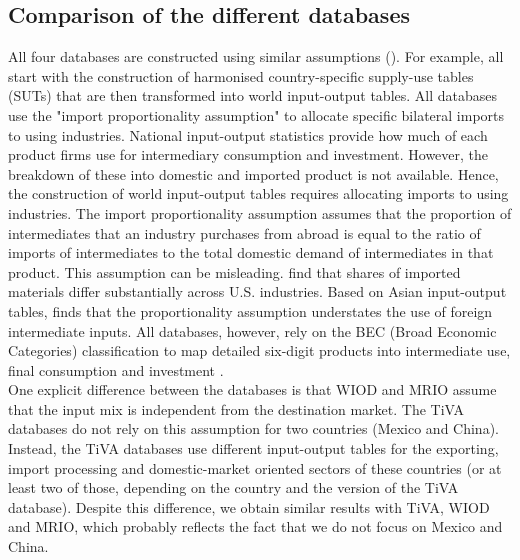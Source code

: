 \documentclass[11pt,a4paper]{paper} %
\begin{document}
\subsection{Comparison of the different databases}
All four databases are constructed using similar assumptions (\cite{OECD2011,Timmer2015,OECD2018}).
For example, all start with the construction of harmonised country-specific supply-use tables (SUTs) that are then transformed into world input-output tables.
All databases use the "import proportionality assumption" to allocate specific bilateral imports to using industries.
National input-output statistics provide how much of each product firms use for intermediary consumption and investment. 
However, the breakdown of these into domestic and imported product is not available. 
Hence, the construction of world input-output tables requires allocating imports to using industries.
The import proportionality assumption assumes that the proportion of intermediates that an industry purchases from abroad is equal to the ratio of imports of intermediates to the total domestic demand of intermediates in that product. 
This assumption can be misleading. \cite{Feenstra2012} find that shares of imported materials differ substantially across U.S. industries. Based on Asian input-output tables, \cite{Puzzello2012} finds that the proportionality assumption understates the use of foreign intermediate inputs. All databases, however, rely on the BEC (Broad Economic Categories) classification to map detailed six-digit products into intermediate use, final consumption and investment \citep{Dietzenbacher2013}. \\
One explicit difference between the databases is that WIOD and MRIO assume that the input mix is independent from the destination market. 
The TiVA databases do not rely on this assumption for two countries (Mexico and China). Instead, the TiVA databases use different input-output tables for the exporting, import processing and domestic-market oriented sectors of these countries (or at least two of those, depending on the country and the version of the TiVA database). Despite this difference, we obtain similar results with TiVA, WIOD and MRIO, which probably reflects the fact that we do not focus on Mexico and China.\\
\end{document}
